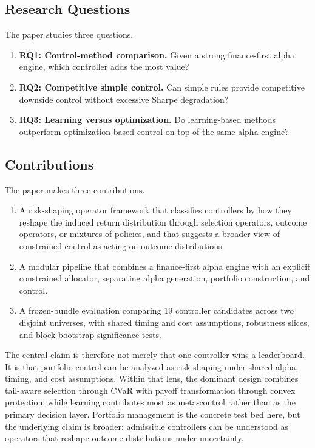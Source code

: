 \documentclass[10pt,twocolumn]{article}
\begin{document}
\subsection{Research Questions}

The paper studies three questions.
\begin{enumerate}[leftmargin=1.5em, itemsep=2pt, topsep=4pt]
\item \textbf{RQ1: Control-method comparison.} Given a strong finance-first
      alpha engine, which controller adds the most value?
\item \textbf{RQ2: Competitive simple control.} Can simple rules provide
      competitive downside control without excessive Sharpe degradation?
\item \textbf{RQ3: Learning versus optimization.} Do learning-based methods
      outperform optimization-based control on top of the same alpha engine?
\end{enumerate}

\subsection{Contributions}

The paper makes three contributions.
\begin{enumerate}[leftmargin=1.5em, itemsep=2pt, topsep=4pt]
\item A risk-shaping operator framework that classifies controllers by how they
      reshape the induced return distribution through selection operators,
      outcome operators, or mixtures of policies, and that suggests a broader
      view of constrained control as acting on outcome distributions.
\item A modular pipeline that combines a finance-first alpha engine with an
      explicit constrained allocator, separating alpha generation, portfolio
      construction, and control.
\item A frozen-bundle evaluation comparing 19 controller candidates across two
      disjoint universes, with shared timing and cost assumptions, robustness
      slices, and block-bootstrap significance tests.
\end{enumerate}

The central claim is therefore not merely that one controller wins a
leaderboard. It is that portfolio control can be analyzed as risk shaping under
shared alpha, timing, and cost assumptions. Within that lens, the dominant
design combines tail-aware selection through CVaR with payoff transformation
through convex protection, while learning contributes most as meta-control
rather than as the primary decision layer. Portfolio management is the concrete
test bed here, but the underlying claim is broader: admissible controllers can
be understood as operators that reshape outcome distributions under
uncertainty.
\end{document}
